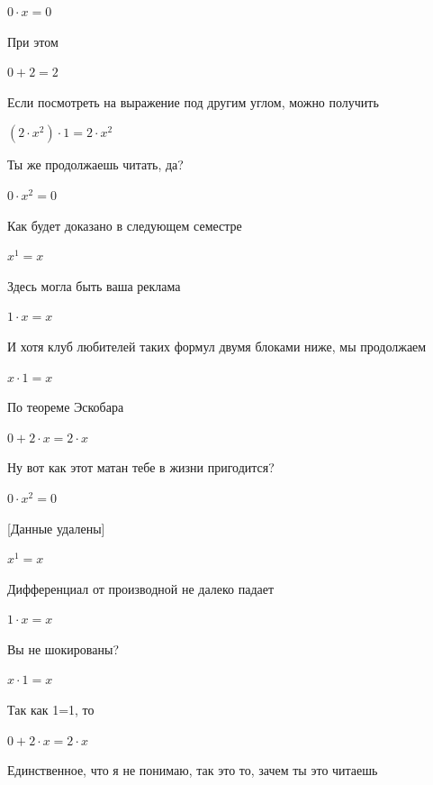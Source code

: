 \documentclass[12pt,a4paper,fleqn]{article}
\begin{document}
\begin{center}
$0 \cdot x = 0$\end{center}
При этом

\begin{center}
$0+2 = 2$\end{center}
Если посмотреть на выражение под другим углом, можно получить

\begin{center}
$(2 \cdot x^{2}) \cdot 1 = 2 \cdot x^{2}$\end{center}
Ты же продолжаешь читать, да?

\begin{center}
$0 \cdot x^{2} = 0$\end{center}
Как будет доказано в следующем семестре

\begin{center}
$x^{1} = x$\end{center}
Здесь могла быть ваша реклама

\begin{center}
$1 \cdot x = x$\end{center}
И хотя клуб любителей таких формул двумя блоками ниже, мы продолжаем

\begin{center}
$x \cdot 1 = x$\end{center}
По теореме Эскобара

\begin{center}
$0+2 \cdot x = 2 \cdot x$\end{center}
Ну вот как этот матан тебе в жизни пригодится?

\begin{center}
$0 \cdot x^{2} = 0$\end{center}
[Данные удалены]

\begin{center}
$x^{1} = x$\end{center}
Дифференциал от производной не далеко падает\cite{link2}

\begin{center}
$1 \cdot x = x$\end{center}
Вы не шокированы?\cite{link3}

\begin{center}
$x \cdot 1 = x$\end{center}
Так как 1=1, то\cite{link4}

\begin{center}
$0+2 \cdot x = 2 \cdot x$\end{center}
Единственное, что я не понимаю, так это то, зачем ты это читаешь
\end{document}
